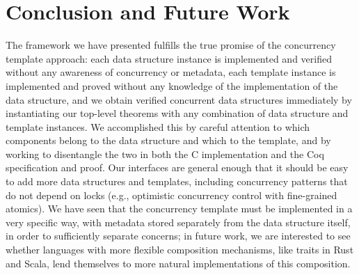 \documentclass[sigplan,screen]{acmart}
\newcommand{\ignore}[1]{}
\begin{document}
\section{Conclusion and Future Work}
The framework we have presented fulfills the true promise of the concurrency template approach: each data structure instance is implemented and verified without any awareness of concurrency or metadata, each template instance is implemented and proved without any knowledge of the implementation of the data structure, and we obtain verified concurrent data structures immediately by instantiating our top-level theorems with any combination of data structure and template instances. We accomplished this by careful attention to which components belong to the data structure and which to the template, and by working to disentangle the two in both the C implementation and the Coq specification and proof. Our interfaces are general enough that it should be easy to add more data structures and templates, including concurrency patterns that do not depend on locks (e.g., optimistic concurrency control with fine-grained atomics). We have seen that the concurrency template must be implemented in a very specific way, with metadata stored separately from the data structure itself, in order to sufficiently separate concerns; in future work, we are interested to see whether languages with more flexible composition mechanisms, like traits in Rust and Scala, lend themselves to more natural implementations of this composition.

\ignore{
\begin{acks}
We thank Nisarg Patel, ...
This work was partially funded by the National Science Foundation under the award ???.
\end{acks}
}

\clearpage



\end{document}
